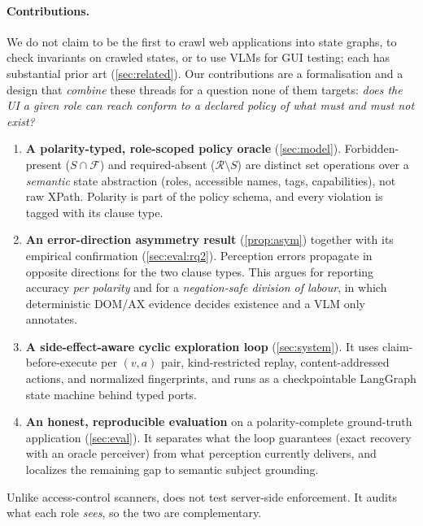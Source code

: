 \paragraph{Contributions.}
We do not claim to be the first to crawl web applications into state graphs,
to check invariants on crawled states, or to use VLMs for GUI testing; each has
substantial prior art (\cref{sec:related}). Our contributions are a
formalisation and a design that \emph{combine} these threads for a question
none of them targets: \emph{does the UI a given role can reach conform to a
declared policy of what must and must not exist?}
\begin{enumerate}
  \item \textbf{A polarity-typed, role-scoped policy oracle}
    (\cref{sec:model}). Forbidden-present ($S\cap\mathcal F$) and
    required-absent ($\mathcal R\setminus S$) are distinct set operations over
    a \emph{semantic} state abstraction (roles, accessible names, tags,
    capabilities), not raw XPath. Polarity is part of the policy schema, and
    every violation is tagged with its clause type.
  \item \textbf{An error-direction asymmetry result}
    (\cref{prop:asym}) together with its empirical confirmation
    (\cref{sec:eval:rq2}). Perception errors propagate in opposite directions
    for the two clause types. This argues for reporting accuracy \emph{per
    polarity} and for a \emph{negation-safe division of labour}, in which
    deterministic DOM/AX evidence decides existence and a VLM only annotates.
  \item \textbf{A side-effect-aware cyclic exploration loop}
    (\cref{sec:system}). It uses claim-before-execute per $(v,a)$ pair,
    kind-restricted replay, content-addressed actions, and normalized
    fingerprints, and runs as a checkpointable LangGraph state machine behind
    typed ports.
  \item \textbf{An honest, reproducible evaluation} on a polarity-complete
    ground-truth application (\cref{sec:eval}). It separates what the loop
    guarantees (exact recovery with an oracle perceiver) from what perception
    currently delivers, and localizes the remaining gap to semantic subject
    grounding.
\end{enumerate}

Unlike access-control scanners, \sys{} does not test server-side enforcement.
It audits what each role \emph{sees}, so the two are complementary.
